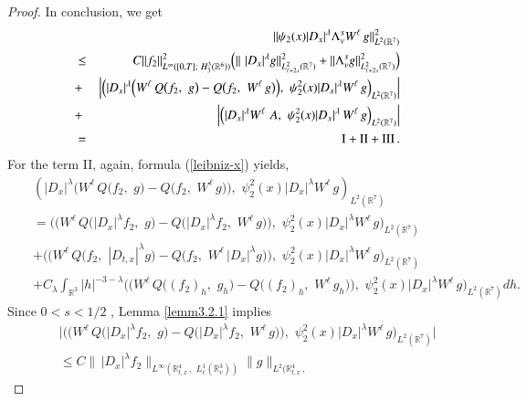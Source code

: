 \documentclass{amsart}[12pt, article]
\begin{document}
\begin{proof}
In conclusion,  we get
\begin{eqnarray*}
&&\|\psi_2(x)|D_{x}|^{\lambda}\Lambda^{s}_v W^{\ell}\,
g\|^2_{L^2({{{\mathbb R}}}^7)}\\
&\leq& C \| f_2\|^2_{L^\infty([0, T];\,\,H^{3}_{3}({{{\mathbb R}}}^6))}\Big(
\|\,\,|D_{x}|^{\lambda} g\|^2_{L^2_{\ell+2s}({{{\mathbb R}}}^7)}+\|\Lambda^{s}_v
g\|^2_{L^2_{\ell+2s}({{{\mathbb R}}}^7)}
\Big)\nonumber\\
& +&\left|\left( |D_{x}|^{\lambda} \Big(W^{\ell}\, Q\big(f_2,\,\,
g\big)-Q\big(f_2,\,\,W^{\ell}\, g\big)\Big),\,\, \psi^2_2(x)|D_{
x}|^{\lambda}W^{\ell}\, g
\right)_{L^2({{{\mathbb R}}}^7)}\right| \nonumber \\
&+&\left|\left(|D_{x}|^{\lambda} W^{\ell}\,\, A,\,\,
\psi^2_2(x)|D_{x}|^{\lambda} \,
W^{\ell}\,g\right)_{L^2({{{\mathbb R}}}^7)}\right|
\nonumber\\
&=& {\rm I}+{\rm II}+{\rm III}\, . \nonumber
\end{eqnarray*}
For the term II,  again, formula (\ref{leibniz-x}) yields,
\begin{eqnarray*}
&&\left( |D_{x}|^{\lambda} \Big(W^{\ell}\, Q\big(f_2,\,\,
g\big)-Q\big(f_2,\,\,W^{\ell}\, g\big)\Big),\,\, \psi^2_2(x)|D_{
x}|^{\lambda}W^{\ell}\, g
\right)_{L^2({{{\mathbb R}}}^7)}\\
&&=\Big(\big( W^{\ell}\, Q\big(|D_{x}|^{\lambda}f_2,\,\,
g\big)-Q\big(|D_{x}|^{\lambda}f_2,\,\, W^{\ell}\, g\big)\big) ,\,\,
\psi^2_2(x)|D_{x}|^{\lambda} W^{\ell}\,g\Big)_{L^2({{{\mathbb R}}}^7)}\\
&&+\Big(\big( W^{\ell}\, Q\big(f_2,\,\, |D_{t, x}|^{\lambda}
g\big)-Q\big(f_2,\,\, W^{\ell}\, |D_{x}|^{\lambda} g\big)\big) ,\,\,
\psi^2_2(x)|D_{x}|^{\lambda} W^{\ell}\,g\Big)_{L^2({{{\mathbb R}}}^7)}
\\
&&+C_\lambda\int_{{{{\mathbb R}}}^3} |h|^{-3-\lambda}\Big( \big( W^{\ell}\,
Q\big((f_2)_h,\,\, g_h\big)-Q\big((f_2)_h,\,\, W^{\ell}\,
g_h\big)\big) ,\,\, \psi^2_2(x)|D_{x}|^{\lambda}
W^{\ell}\,g\Big)_{L^2({{{\mathbb R}}}^7)}d h.
\end{eqnarray*}
Since $0<s<1/2$ , Lemma \ref{lemm3.2.1} implies
\begin{eqnarray*}
&&\Big|\Big(\big( W^{\ell}\, Q\big(|D_{x}|^{\lambda}f_2,\,\,
g\big)-Q\big(|D_{x}|^{\lambda}f_2,\,\, W^{\ell}\, g\big)\big) ,\,\,
\psi^2_2(x)|D_{x}|^{\lambda} W^{\ell}\,g\Big)_{L^2({{{\mathbb R}}}^7)}\Big|\\
&&\leq C\|\,|D_{x}|^{\lambda}f_2\|_{L^\infty({{{\mathbb R}}}^4_{t, x}\,, \,\,
L^1_{\ell}({{{\mathbb R}}}^3_v))} \|g\|_{L^2({{{\mathbb R}}}^4_{t, x}\,, \,\,
}
\end{eqnarray*}
\end{proof}
\end{document}
